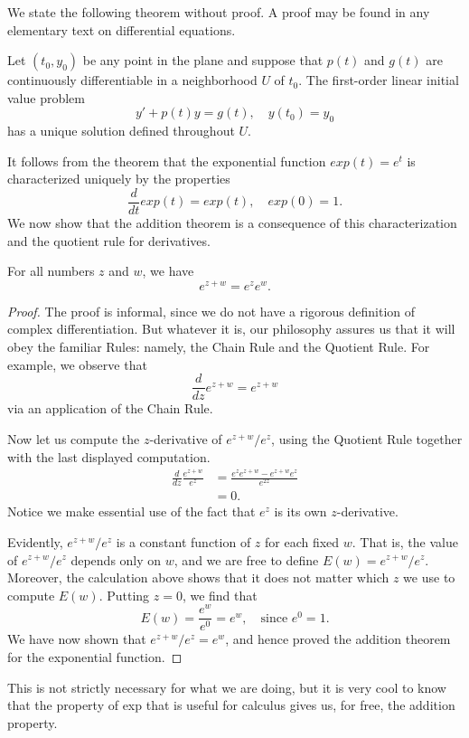 \documentclass[twocolumn,12pt]{article}
\begin{document}
We state the following theorem without proof. A proof may be found in any elementary text on differential equations.
\begin{theorem}
  Let $(t_0, y_0)$ be any point in the plane and suppose that $p(t)$ and $g(t)$ are continuously differentiable in a neighborhood $U$ of $t_0$. The first-order linear initial value problem
  \[
    y' + p(t)y = g(t), \quad y(t_0) = y_0
  \]
  has a unique solution defined throughout $U$.
\end{theorem}
It follows from the theorem that the exponential function $exp(t) = e^t$ is characterized uniquely by the properties
\[
  \frac{d}{dt} exp(t) = exp(t), \quad exp(0) = 1.
\]
We now show that the addition theorem is a consequence of this characterization and the quotient rule for derivatives.
\begin{theorem} \label{thm:characterizationofexp}
  For all numbers $z$ and $w$, we have
  \[
    e^{z+w} = e^z e^w.
  \]
\end{theorem}
\begin{proof}
  The proof is informal, since we do not have a rigorous definition of complex differentiation. But whatever it is, our philosophy assures us that it will obey the familiar Rules: namely, the Chain Rule and the Quotient Rule. For example, we observe that
  \begin{displaymath}
    \frac{d}{dz} e^{z+w} = e^{z+w}
  \end{displaymath}
  via an application of the Chain Rule.
  
  Now let us compute the $z$-derivative of $e^{z+w}/e^z$, using the Quotient Rule together with the last displayed computation.
  \begin{align*}
    \frac{d}{dz} \frac{e^{z+w}}{e^z} 
      &= \frac{e^z e^{z+w} - e^{z+w}e^z}{e^{2z}} \\
      &= 0.
  \end{align*}
  Notice we make essential use of the fact that $e^z$ is its own $z$-derivative. 

  Evidently, $e^{z+w}/e^z$ is a constant function of $z$ for each fixed $w$. That is, the value of $e^{z+w}/e^z$ depends only on $w$, and we are free to define $E(w) = e^{z+w}/e^z$. Moreover, the calculation above shows that it does not matter which $z$ we use to compute $E(w)$. Putting $z = 0$, we find that
  \[
    E(w) = \frac{e^{w}}{e^0} = e^w, \quad \text{since $e^0 = 1$}.
  \]
  We have now shown that $e^{z+w}/e^z = e^w$, and hence proved the addition theorem for the exponential function.
\end{proof}
This is not strictly necessary for what we are doing, but it is very cool to know that the property of exp that is useful for calculus gives us, for free, the addition property.
\end{document}
